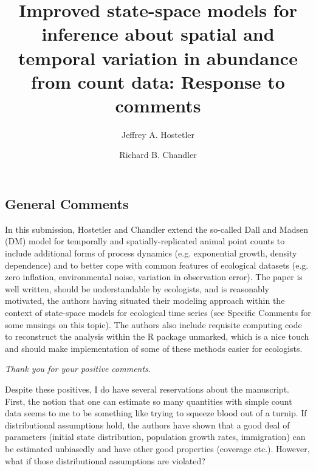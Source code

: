 \documentclass[12pt,english]{article}
\title{Improved state-space models for inference about 
spatial and temporal variation in abundance from count data: Response to comments}
\author{Jeffrey A. Hostetler
   \and Richard B. Chandler    
}
\date{}
\begin{document}
\maketitle
\vspace{-1cm}
\begin{spacing}{1.9}
\begin{flushleft}
\renewcommand*\thetable{R\arabic{table}}
\renewcommand*\thefigure{R\arabic{figure}}
\renewcommand*\theequation{R\arabic{equation}}

\section*{General Comments}
\label{sec:general}

In this submission, Hostetler and Chandler extend the so-called Dall and Madsen (DM) 
model for temporally and spatially-replicated animal point counts to include additional 
forms of process dynamics (e.g. exponential growth, density dependence) and to better 
cope with common features of ecological datasets (e.g. zero inflation, environmental noise, 
variation in observation error). The paper is well written, should be understandable by ecologists, 
and is reasonably motivated, the authors having situated their modeling approach within the 
context of state-space models for ecological time series (see Specific Comments for some 
musings on this topic). The authors also include requisite computing code to reconstruct the 
analysis within the R package unmarked, which is a nice touch and should make implementation 
of some of these methods easier for ecologists.

\vspace{0.5cm}
\textit{Thank you for your positive comments.}
\vspace{0.5cm}

Despite these positives, I do have several reservations about the manuscript. First, the notion that 
one can estimate so many quantities with simple count data seems to me to be something like trying 
to squeeze blood out of a turnip. If distributional assumptions hold, the authors have shown that a 
good deal of parameters (initial state distribution, population growth rates, immigration) can be 
estimated unbiasedly and have other good properties (coverage etc.). However, what if those 
distributional assumptions are violated?


\end{flushleft}
\end{spacing}
\end{document}
